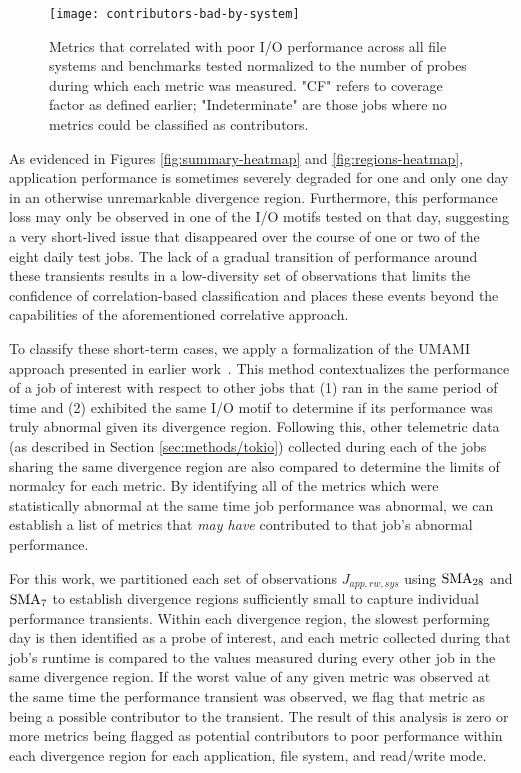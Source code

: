 \begin{figure}
    \centering
    \texttt{[image: contributors-bad-by-system]}
    \vspace{-.35in}
    \caption{Metrics that correlated with poor I/O performance across all file systems and benchmarks tested normalized to the number of probes during which each metric was measured.
    "CF" refers to coverage factor as defined earlier;
    "Indeterminate" are those jobs where no metrics could be classified as contributors.
    }
    \label{fig:contributors-bad-by-system}
\end{figure}

As evidenced in Figures \ref{fig:summary-heatmap} and \ref{fig:regions-heatmap}, application performance is sometimes severely degraded for one and only one day in an otherwise unremarkable divergence region.
Furthermore, this performance loss may only be observed in one of the I/O motifs tested on that day, suggesting a very short-lived issue that disappeared over the course of one or two of the eight daily test jobs.
The lack of a gradual transition of performance around these transients results in a low-diversity set of observations that limits the confidence of correlation-based classification and places these events beyond the capabilities of the aforementioned correlative approach.

To classify these short-term cases, we apply a formalization of the UMAMI approach presented in earlier work~\cite{Lockwood2017}.
This method contextualizes the performance of a job of interest with respect to other jobs that (1) ran in the same period of time and (2) exhibited the same I/O motif to determine if its performance was truly abnormal given its divergence region.
Following this, other telemetric data (as described in Section \ref{sec:methods/tokio}) collected during each of the jobs sharing the same divergence region are also compared to determine the limits of normalcy for each metric.
By identifying all of the metrics which were statistically abnormal at the same time job performance was abnormal, we can establish a list of metrics that \emph{may have} contributed to that job's abnormal performance.

For this work, we partitioned each set of observations $J_{app, rw, sys}$ using $\textup{SMA}_{28}$ and $\textup{SMA}_{7}$ to establish divergence regions sufficiently small to capture individual performance transients.
Within each divergence region, the slowest performing day is then identified as a probe of interest, and each metric collected during that job's runtime is compared to the values measured during every other job in the same divergence region.
If the worst value of any given metric was observed at the same time the performance transient was observed, we flag that metric as being a possible contributor to the transient.
The result of this analysis is zero or more metrics being flagged as potential contributors to poor performance within each divergence region for each application, file system, and read/write mode.

